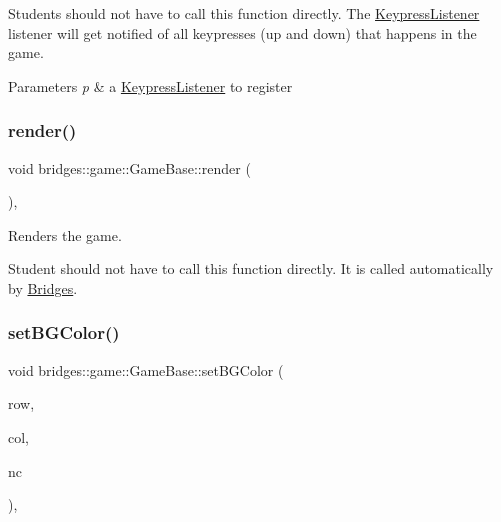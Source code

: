 Students should not have to call this function directly. The \mbox{\hyperlink{classbridges_1_1game_1_1_keypress_listener}{Keypress\+Listener}} listener will get notified of all keypresses (up and down) that happens in the game.


\begin{DoxyParams}{Parameters}
{\em p} & a \mbox{\hyperlink{classbridges_1_1game_1_1_keypress_listener}{Keypress\+Listener}} to register \\
\hline
\end{DoxyParams}
\mbox{\label{classbridges_1_1game_1_1_game_base_ac042479b1d1cf87b8ea7c8884d5326b6}} 
\subsubsection{\texorpdfstring{render()}{render()}}
{\footnotesize\ttfamily void bridges\+::game\+::\+Game\+Base\+::render (\begin{DoxyParamCaption}{ }\end{DoxyParamCaption})\hspace{0.3cm}{\ttfamily [inline]}, {\ttfamily [protected]}}



Renders the game. 

Student should not have to call this function directly. It is called automatically by \mbox{\hyperlink{classbridges_1_1_bridges}{Bridges}}. \mbox{\label{classbridges_1_1game_1_1_game_base_ab667bbca1c81e5fb3aa8d81d70fe8cd2}} 
\subsubsection{\texorpdfstring{set\+B\+G\+Color()}{setBGColor()}}
{\footnotesize\ttfamily void bridges\+::game\+::\+Game\+Base\+::set\+B\+G\+Color (\begin{DoxyParamCaption}\item[{int}]{row,  }\item[{int}]{col,  }\item[{\mbox{\hyperlink{namespacebridges_1_1game_afaa832a4322b25b6a4ebfba832f10f26}{Named\+Color}}}]{nc }\end{DoxyParamCaption})\hspace{0.3cm}{\ttfamily [inline]}, {\ttfamily [protected]}}



